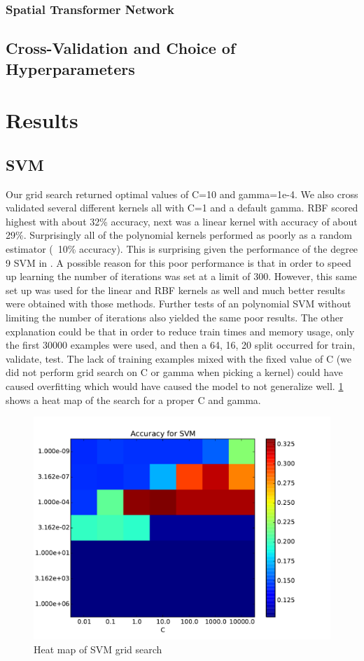\documentclass[conference]{IEEEtran}
\begin{document}
\subsubsection{Spatial Transformer Network}

\subsection{Cross-Validation and Choice of Hyperparameters}

\section{Results}
\subsection{SVM}
Our grid search returned optimal values of C=10 and gamma=1e-4. We also cross validated several different kernels all with C=1 and a default gamma. RBF scored highest with about 32\% accuracy, next was a linear kernel with accuracy of about 29\%. Surprisingly all of the polynomial kernels performed as poorly as a random estimator (~10\% accuracy). This is surprising given the performance of the degree 9 SVM in \cite{LeCunn98}. A possible reason for this poor performance is that in order to speed up learning the number of iterations was set at a limit of 300. However, this same set up was used for the linear and RBF kernels as well and much better results were obtained with those methods. Further tests of an polynomial SVM without limiting the number of iterations also yielded the same poor results. The other explanation could be that in order to reduce train times and memory usage, only the first 30000 examples were used, and then a 64, 16, 20 split occurred for train, validate, test. The lack of training examples mixed with the fixed value of C (we did not perform grid search on C or gamma when picking a kernel) could have caused overfitting which would have caused the model to not generalize well. \ref{SVMGrid} shows a heat map of the search for a proper C and gamma. 

\begin{figure}[h]
	\centering
	\includegraphics[scale=0.4]{SVM_grid_search.pdf}
	\caption{Heat map of SVM grid search}
	\label{SVMGrid}
\end{figure}
\end{document}
